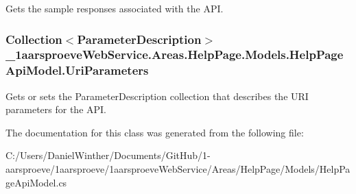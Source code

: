 Gets the sample responses associated with the A\+P\+I. 

\hypertarget{class__1aarsproeve_web_service_1_1_areas_1_1_help_page_1_1_models_1_1_help_page_api_model_a13910e263edc19222bbb60615d1f80be}{}
\subsubsection[{Uri\+Parameters}]{\setlength{\rightskip}{0pt plus 5cm}Collection$<${\bf Parameter\+Description}$>$ \+\_\+1aarsproeve\+Web\+Service.\+Areas.\+Help\+Page.\+Models.\+Help\+Page\+Api\+Model.\+Uri\+Parameters\hspace{0.3cm}{\ttfamily [get]}}\label{class__1aarsproeve_web_service_1_1_areas_1_1_help_page_1_1_models_1_1_help_page_api_model_a13910e263edc19222bbb60615d1f80be}


Gets or sets the Parameter\+Description collection that describes the U\+R\+I parameters for the A\+P\+I. 



The documentation for this class was generated from the following file\+:\begin{DoxyCompactItemize}
\item 
C\+:/\+Users/\+Daniel\+Winther/\+Documents/\+Git\+Hub/1-\/aarsproeve/1aarsproeve/1aarsproeve\+Web\+Service/\+Areas/\+Help\+Page/\+Models/Help\+Page\+Api\+Model.\+cs\end{DoxyCompactItemize}
